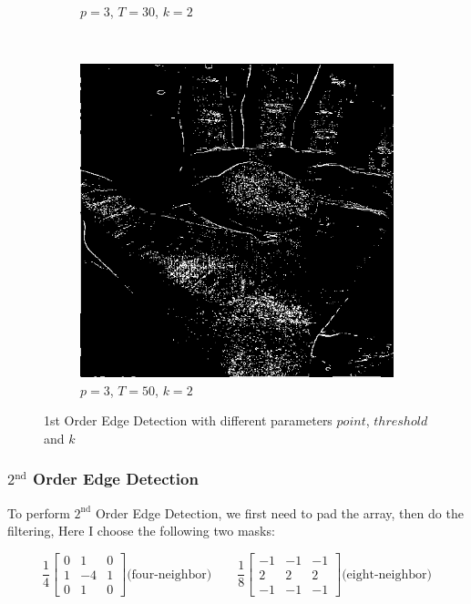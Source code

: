 \documentclass{article}
\begin{document}
\begin{enumerate}[label=(\alph*)]
\begin{figure}
\begin{subfigure}[b]{0.3\textwidth}
            \caption{$p = 3$, $T = 30$, $k = 2$}
        \end{subfigure}
        ~
        \begin{subfigure}[b]{0.3\textwidth}
            \includegraphics[width=\textwidth]{img/ED1_3_50.png}
            \caption{$p = 3$, $T = 50$, $k = 2$}
        \end{subfigure}
        
        \caption{1st Order Edge Detection with different parameters $point$, $threshold$ and $k$}
    \end{figure}

    \newpage
    \subsubsection*{$2^\text{nd}$ Order Edge Detection}

    To perform $2^\text{nd}$ Order Edge Detection, we first need to pad the array, then do the filtering, Here I choose the following two masks:

    $$
    \frac{1}{4} 
    \begin{bmatrix}
        0 &  1 & 0 \\
        1 & -4 & 1 \\
        0 &  1 & 0
    \end{bmatrix} \text{(four-neighbor)} \qquad
    \frac{1}{8}
    \begin{bmatrix}
        -1 & -1 & -1 \\
        2 &  2 &  2 \\
        -1 & -1 & -1
    \end{bmatrix} \text{(eight-neighbor)}
    $$


\end{enumerate}
\end{document}
